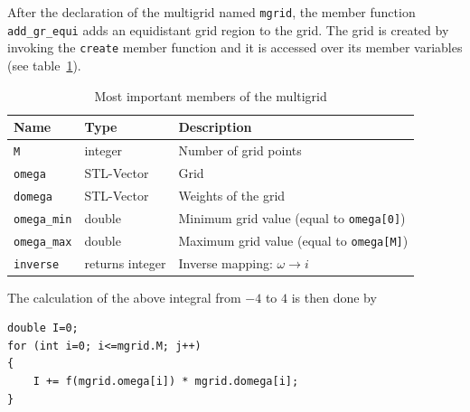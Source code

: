 After the declaration of the multigrid named \texttt{mgrid}, the member function \texttt{add\_gr\_equi} adds an equidistant grid region to the grid. The grid is created by invoking the \texttt{create} member function and it is accessed over its member variables (see table~\ref{tab:member}). 



\begin{table}[h]
	\begin{center}
		\begin{tabular}{l|l|l}\hline
		Name & Type & Description \\ \hline
		\texttt{M} & integer & Number of grid points\\\hline
		\texttt{omega} & STL-Vector & Grid\\\hline
		\texttt{domega} & STL-Vector & Weights of the grid\\\hline
		\texttt{omega\_min} & double & Minimum grid value (equal to \texttt{omega[0]}) \\\hline
		\texttt{omega\_max} & double & Maximum grid value (equal to \texttt{omega[M]}) \\\hline
		\texttt{inverse} & returns integer & Inverse mapping: $\omega\to i$ \\\hline
		\end{tabular}
	\end{center}
	\caption{Most important members of the multigrid}
	\label{tab:member}
\end{table}

The calculation of the above integral from $-4$ to $4$ is then done by

\begin{lstlisting}
double I=0;
for (int i=0; i<=mgrid.M; j++)
{
	I += f(mgrid.omega[i]) * mgrid.domega[i];
}
\end{lstlisting}

